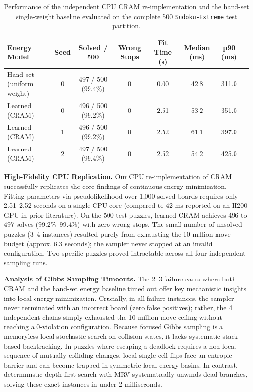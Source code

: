 \documentclass{article} %
\begin{document}
\begin{table}[t]
\caption{Performance of the independent CPU CRAM re-implementation and the hand-set single-weight baseline evaluated on the complete 500 \texttt{Sudoku-Extreme} test partition.}
\label{tab:cram_results}
\begin{center}
\begin{tabular}{lccccccr}
\toprule
\textbf{Energy Model} & \textbf{Seed} & \textbf{Solved / 500} & \textbf{Wrong Stops} & \textbf{Fit Time (s)} & \textbf{Median (ms)} & \textbf{p90 (ms)} \\
\midrule
Hand-set (uniform weight) & 0 & 497 / 500 (99.4\%) & 0 & 0.00 & 42.8 & 311.0 \\
Learned (CRAM)            & 0 & 496 / 500 (99.2\%) & 0 & 2.51 & 53.2 & 351.0 \\
Learned (CRAM)            & 1 & 496 / 500 (99.2\%) & 0 & 2.52 & 61.1 & 397.0 \\
Learned (CRAM)            & 2 & 497 / 500 (99.4\%) & 0 & 2.52 & 54.2 & 425.0 \\
\bottomrule
\end{tabular}
\end{center}
\end{table}

\textbf{High-Fidelity CPU Replication.} Our CPU re-implementation of CRAM successfully replicates the core findings of continuous energy minimization. Fitting parameters via pseudolikelihood over 1,000 solved boards requires only 2.51--2.52 seconds on a single CPU core (compared to 42 ms reported on an H200 GPU in prior literature). On the 500 test puzzles, learned CRAM achieves 496 to 497 solves (99.2\%--99.4\%) with zero wrong stops. The small number of unsolved puzzles (3--4 instances) resulted purely from exhausting the 10-million move budget (approx. 6.3 seconds); the sampler never stopped at an invalid configuration. Two specific puzzles proved intractable across all four independent sampling runs.

\textbf{Analysis of Gibbs Sampling Timeouts.} The 2--3 failure cases where both CRAM and the hand-set energy baseline timed out offer key mechanistic insights into local energy minimization. Crucially, in all failure instances, the sampler never terminated with an incorrect board (zero false positives); rather, the 4 independent chains simply exhausted the 10-million move ceiling without reaching a 0-violation configuration. Because focused Gibbs sampling is a memoryless local stochastic search on collision states, it lacks systematic stack-based backtracking. In puzzles where escaping a deadlock requires a non-local sequence of mutually colliding changes, local single-cell flips face an entropic barrier and can become trapped in symmetric local energy basins. In contrast, deterministic depth-first search with MRV systematically unwinds dead branches, solving these exact instances in under 2 milliseconds.
\end{document}
